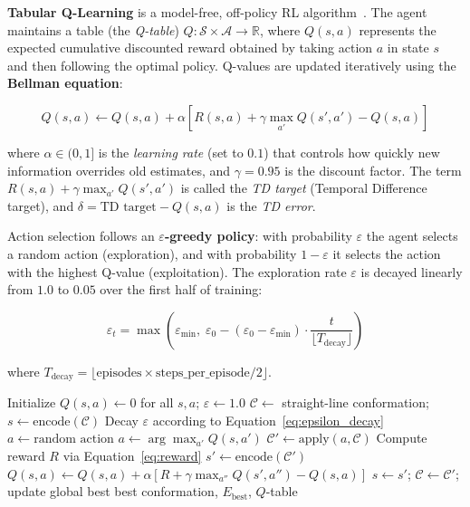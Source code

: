 \textbf{Tabular Q-Learning} is a model-free, off-policy RL algorithm~\cite{watkins1992qlearning}. The agent maintains a table (the \textit{Q-table}) $Q: \mathcal{S} \times \mathcal{A} \rightarrow \mathbb{R}$, where $Q(s, a)$ represents the expected cumulative discounted reward obtained by taking action $a$ in state $s$ and then following the optimal policy. Q-values are updated iteratively using the \textbf{Bellman equation}:

\begin{equation}
    Q(s,a) \leftarrow Q(s,a) + \alpha \left[ R(s,a) + \gamma \max_{a'} Q(s',a') - Q(s,a) \right]
    \label{eq:qlearning}
\end{equation}

where $\alpha \in (0,1]$ is the \textit{learning rate} (set to $0.1$) that controls how quickly new information overrides old estimates, and $\gamma = 0.95$ is the discount factor. The term $R(s,a) + \gamma \max_{a'} Q(s',a')$ is called the \textit{TD target} (Temporal Difference target), and $\delta = \text{TD target} - Q(s,a)$ is the \textit{TD error}.

Action selection follows an \textbf{$\varepsilon$-greedy policy}: with probability $\varepsilon$ the agent selects a random action (exploration), and with probability $1 - \varepsilon$ it selects the action with the highest Q-value (exploitation). The exploration rate $\varepsilon$ is decayed linearly from $1.0$ to $0.05$ over the first half of training:

\begin{equation}
    \varepsilon_t = \max\!\left(\varepsilon_{\min},\; \varepsilon_0 - (\varepsilon_0 - \varepsilon_{\min}) \cdot \frac{t}{\lfloor T_{\text{decay}} \rfloor}\right)
    \label{eq:epsilon_decay}
\end{equation}

where $T_{\text{decay}} = \lfloor \text{episodes} \times \text{steps\_per\_episode} / 2 \rfloor$.

\begin{algorithm}[H]
\caption{Tabular Q-Learning for HP folding}
\label{alg:ql}
\begin{algorithmic}[1]
\State Initialize $Q(s,a) \leftarrow 0$ for all $s, a$; $\varepsilon \leftarrow 1.0$
    \State $\mathcal{C} \leftarrow$ straight-line conformation; $s \leftarrow \text{encode}(\mathcal{C})$
        \State Decay $\varepsilon$ according to Equation~\ref{eq:epsilon_decay}
            \State $a \leftarrow \text{random action}$ 
        \Else
            \State $a \leftarrow \arg\max_{a'} Q(s, a')$ 
        \EndIf
        \State $\mathcal{C}' \leftarrow \text{apply}(a, \mathcal{C})$
        \State Compute reward $R$ via Equation~\ref{eq:reward}
        \State $s' \leftarrow \text{encode}(\mathcal{C}')$
        \State $Q(s,a) \leftarrow Q(s,a) + \alpha[R + \gamma \max_{a''} Q(s',a'') - Q(s,a)]$
        \State $s \leftarrow s'$; $\mathcal{C} \leftarrow \mathcal{C}'$; update global best
    \EndFor
\EndFor
\State \Return best conformation, $E_{\text{best}}$, $Q$-table
\end{algorithmic}
\end{algorithm}

